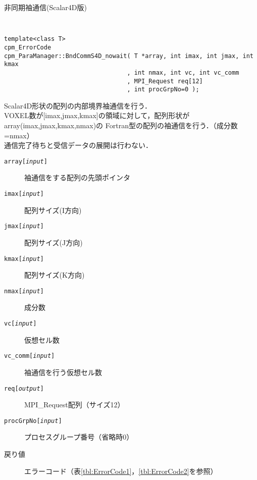 \begin{spacing}{0.8}
\begin{itembox}[l]{非同期袖通信(Scalar4D版)}
{\tt
\begin{verbatim}
template<class T>
cpm_ErrorCode
cpm_ParaManager::BndCommS4D_nowait( T *array, int imax, int jmax, int kmax
                                  , int nmax, int vc, int vc_comm
                                  , MPI_Request req[12]
                                  , int procGrpNo=0 );
\end{verbatim}
}
Scalar4D形状の配列の内部境界袖通信を行う．\\
VOXEL数が[imax,jmax,kmax]の領域に対して，配列形状がarray(imax,jmax,kmax,nmax)の
Fortran型の配列の袖通信を行う．（成分数=nmax）\\
通信完了待ちと受信データの展開は行わない．
\begin{description}
\item[{\tt array[{\it input}]}] 袖通信をする配列の先頭ポインタ
\item[{\tt imax[{\it input}]}] 配列サイズ(I方向)
\item[{\tt jmax[{\it input}]}] 配列サイズ(J方向)
\item[{\tt kmax[{\it input}]}] 配列サイズ(K方向)
\item[{\tt nmax[{\it input}]}] 成分数
\item[{\tt vc[{\it input}]}] 仮想セル数
\item[{\tt vc\_comm[{\it input}]}] 袖通信を行う仮想セル数
\item[{\tt req[{\it output}]}] MPI\_Request配列（サイズ12）
\item[{\tt procGrpNo[{\it input}]}] プロセスグループ番号（省略時0）
\\
\item[戻り値] エラーコード（表\ref{tbl:ErrorCode1}，\ref{tbl:ErrorCode2}を参照）
\end{description}
\end{itembox}\\
\end{spacing}

